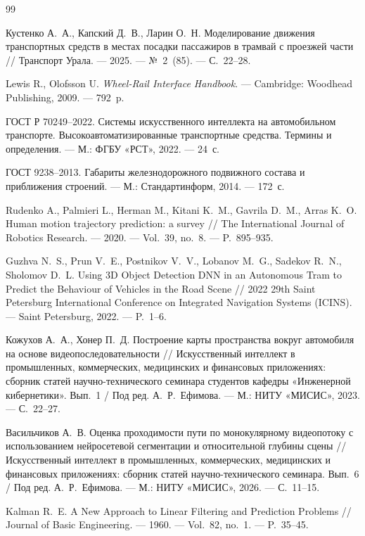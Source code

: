 \documentclass{misisarticle}
\begin{document}
\begin{thebibliography}{99}

 Кустенко А.~А., Капский Д.~В., Ларин О.~Н. Моделирование движения транспортных средств в местах посадки пассажиров в трамвай с проезжей части // Транспорт Урала. --- 2025. --- №~2~(85). --- С.~22--28.

 Lewis R., Olofsson U. \textit{Wheel-Rail Interface Handbook}. --- Cambridge: Woodhead Publishing, 2009. --- 792~p.

 ГОСТ Р 70249--2022. Системы искусственного интеллекта на автомобильном транспорте. Высокоавтоматизированные транспортные средства. Термины и определения. --- М.: ФГБУ «РСТ», 2022. --- 24~с.

 ГОСТ 9238--2013. Габариты железнодорожного подвижного состава и приближения строений. --- М.: Стандартинформ, 2014. --- 172~с.

 Rudenko A., Palmieri L., Herman M., Kitani K.~M., Gavrila D.~M., Arras K.~O. Human motion trajectory prediction: a survey // The International Journal of Robotics Research. --- 2020. --- Vol.~39, no.~8. --- P.~895--935.

 Guzhva N.~S., Prun V.~E., Postnikov V.~V., Lobanov M.~G., Sadekov R.~N., Sholomov D.~L. Using 3D Object Detection DNN in an Autonomous Tram to Predict the Behaviour of Vehicles in the Road Scene // 2022 29th Saint Petersburg International Conference on Integrated Navigation Systems (ICINS). --- Saint Petersburg, 2022. --- P.~1--6.

 Кожухов А.~А., Хонер П.~Д. Построение карты пространства вокруг автомобиля на основе видеопоследовательности // Искусственный интеллект в промышленных, коммерческих, медицинских и финансовых приложениях: сборник статей научно-технического семинара студентов кафедры «Инженерной кибернетики». Вып.~1 / Под ред. А.~Р.~Ефимова. --- М.: НИТУ «МИСИС», 2023. --- С.~22--27.

 Васильчиков А.~В. Оценка проходимости пути по монокулярному видеопотоку с использованием нейросетевой сегментации и относительной глубины сцены // Искусственный интеллект в промышленных, коммерческих, медицинских и финансовых приложениях: сборник статей научно-технического семинара. Вып.~6 / Под ред. А.~Р.~Ефимова. --- М.: НИТУ «МИСИС», 2026. --- С.~11--15.

 Kalman R.~E. A New Approach to Linear Filtering and Prediction Problems // Journal of Basic Engineering. --- 1960. --- Vol.~82, no.~1. --- P.~35--45.


\end{thebibliography}
\end{document}
